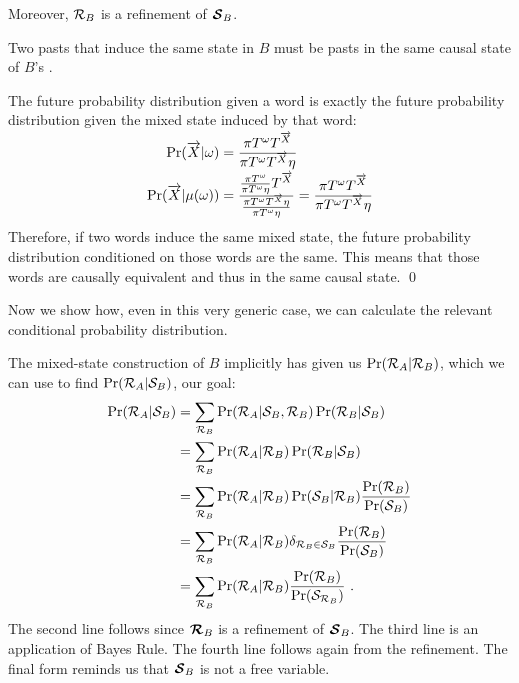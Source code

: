 Moreover, $\mathcal{R}_B$ is a refinement of $\boldsymbol{\mathcal{S}}_B$.

\begin{Prop}
Two pasts that induce the same state in $B$ must be pasts in the same
causal state of $B$'s \eM.
\end{Prop}

\begin{ProProp}
The future probability distribution given a word is exactly the future
probability distribution given the mixed state induced by that word:
\begin{align*}
\Pr(\smash{\overrightarrow{{X}}} | \omega)
  & = \frac{\pi T^{\omega} T^{\smash{\overrightarrow{{X}}}}}
  	{\pi T^{\omega} T^{\smash{\overrightarrow{{X}}}} \eta}\\
\Pr(\smash{\overrightarrow{{X}}} | \mu(\omega))
  & = \frac{\frac{\pi T^{\omega}}{\pi T^{\omega} \eta} T^{\smash{\overrightarrow{{X}}}}}
  	{\frac{\pi T^{\omega} T^{\smash{\overrightarrow{{X}}}} \eta}{\pi T^{\omega} \eta}}
  = \frac{\pi T^{\omega} T^{\smash{\overrightarrow{{X}}}}}{\pi T^{\omega} T^{\smash{\overrightarrow{{X}}}} \eta}
\end{align*}
Therefore, if two words induce the same mixed state, the future probability
distribution conditioned on those words are the same. This means that those
words are causally equivalent and thus in the same causal state.
\qed
\end{ProProp}

Now we show how, even in this very generic case, we can calculate the relevant
conditional probability distribution.

The mixed-state construction of $B$ implicitly has given us
$\Pr(\mathcal{R}_A | \mathcal{R}_B)$, which we can use to
find $\Pr(\mathcal{R}_A | \mathcal{S}_B)$, our goal:
\begin{align*}
\Pr(\mathcal{R}_A | \mathcal{S}_B)
  &= \sum_{\mathcal{R}_B}
  	\Pr(\mathcal{R}_A | \mathcal{S}_B, \mathcal{R}_B)
	\Pr(\mathcal{R}_B | \mathcal{S}_B) \\
  &= \sum_{\mathcal{R}_B}
  	\Pr(\mathcal{R}_A | \mathcal{R}_B)
	\Pr(\mathcal{R}_B | \mathcal{S}_B) \\
  &= \sum_{\mathcal{R}_B}
  	\Pr(\mathcal{R}_A | \mathcal{R}_B)
	\Pr(\mathcal{S}_B | \mathcal{R}_B)
	\frac{\Pr(\mathcal{R}_B)}{\Pr(\mathcal{S}_B)} \\
  &= \sum_{\mathcal{R}_B}
  	\Pr(\mathcal{R}_A | \mathcal{R}_B)
	\delta_{\mathcal{R}_B \in \mathcal{S}_B}
	\frac{\Pr(\mathcal{R}_B)}{\Pr(\mathcal{S}_B)} \\
  &= \sum_{\mathcal{R}_B}
  	\Pr(\mathcal{R}_A | \mathcal{R}_B)
	\frac{\Pr(\mathcal{R}_B)}{\Pr(\mathcal{S}_{\mathcal{R}_B})} ~.
\end{align*}
The second line follows since $\boldsymbol{\mathcal{R}}_B$ is a refinement of
$\boldsymbol{\mathcal{S}}_B$. The third line is an application of Bayes Rule. The
fourth line follows again from the refinement. The final form reminds us that
$\boldsymbol{\mathcal{S}}_B$ is not a free variable.


